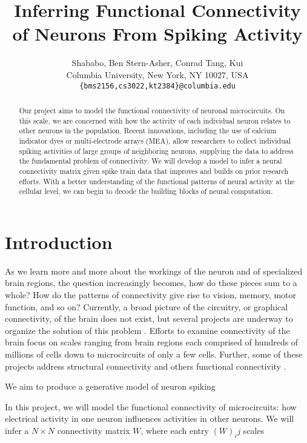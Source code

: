 \documentclass{article}
\title{Inferring Functional Connectivity of Neurons From Spiking Activity}
\author{
Shababo, Ben \hspace{1cm} Stern-Asher, Conrad \hspace{1cm} Tang, Kui\\
Columbia University, New York, NY 10027, USA \\
\texttt{\{bms2156,cs3022,kt2384\}@columbia.edu}
}
\begin{document}
\maketitle

\begin{abstract}
Our project aims to model the functional connectivity of neuronal
microcircuits. On this scale, we are concerned with how the activity
of each individual neuron relates to other neurons in the
population. Recent innovations, including the use of calcium indicator
dyes or multi-electrode arrays (MEA), allow researchers to collect
individual spiking activities of large groups of neighboring neurons,
supplying the data to address the fundamental problem of connectivity.
We will develop a model to infer a neural connectivity matrix given
spike train data that improves and builds on prior research efforts.
With a better understanding of the functional patterns of neural
activity at the cellular level, we can begin to decode the building
blocks of neural computation.
\end{abstract}

\section{Introduction}
\label{sec:introduction}

As we learn more and more about the workings of the neuron and of
specialized brain regions, the question increasingly becomes, how
do these pieces sum to a whole? How do the patterns of connectivity
give rise to vision, memory, motor function, and so on? Currently, a broad picture of the circuitry, or graphical connectivity,
of the brain does not exist, but several projects are underway to organize the solution of
this problem \citep{Marcus2011, Bohland2009}. Efforts to examine connectivity of the brain focus on scales ranging from brain regions each comprised of hundreds of
millions of cells down to microcircuits of only a few cells. Further,
some of these projects address structural connectivity and others
functional connectivity \citep{KnowlesBarley2011, Jain2010, Ropireddy2011, Chiang2011, bhattacharya2006}.

We aim to produce a generative model of neuron spiking

In this project, we will model the functional connectivity of
microcircuits: how electrical activity in one neuron influences
activities in other neurons. We will infer a $ N \times N $
connectivity matrix $ W $, where each entry $ (W)_ij $ scales
\end{document}
